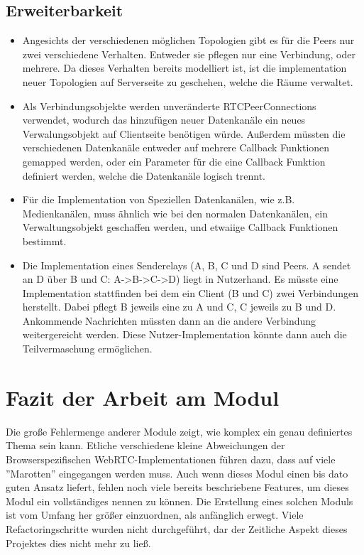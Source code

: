 \subsection{Erweiterbarkeit}
\begin{itemize}
\item
Angesichts der verschiedenen möglichen Topologien gibt es für die Peers nur zwei verschiedene Verhalten. 
Entweder sie pflegen nur eine Verbindung, oder mehrere.
Da dieses Verhalten bereits modelliert ist, ist die implementation neuer Topologien auf Serverseite zu geschehen, welche die Räume verwaltet.

\item
Als Verbindungsobjekte werden unveränderte RTCPeerConnections verwendet, wodurch das hinzufügen neuer Datenkanäle ein neues Verwalungsobjekt auf Clientseite benötigen würde.
Außerdem müssten die verschiedenen Datenkanäle entweder auf mehrere Callback Funktionen gemapped werden, oder ein Parameter für die eine Callback Funktion definiert werden, welche die Datenkanäle logisch trennt.

\item
Für die Implementation von Speziellen Datenkanälen, wie z.B. Medienkanälen, muss ähnlich wie bei den normalen Datenkanälen, ein Verwaltungsobjekt geschaffen werden, und etwaiige Callback Funktionen bestimmt.

\item
Die Implementation eines Senderelays (A, B, C und D sind Peers. A sendet an D über B und C: A->B->C->D) liegt in Nutzerhand. Es müsste eine Implementation stattfinden bei dem ein Client (B und C) zwei Verbindungen herstellt. 
Dabei pflegt B jeweils eine zu A und C, C jeweils zu B und D.
Ankommende Nachrichten müssten dann an die andere Verbindung weitergereicht werden.
Diese Nutzer-Implementation könnte dann auch die Teilvermaschung ermöglichen.
\end{itemize}



\section{Fazit der Arbeit am Modul}
Die große Fehlermenge anderer Module zeigt, wie komplex ein genau definiertes Thema sein kann.
Etliche verschiedene kleine Abweichungen der Browserspezifischen WebRTC-Implementationen führen dazu, dass auf viele ''Marotten'' eingegangen werden muss.
Auch wenn dieses Modul einen bis dato guten Ansatz liefert, fehlen noch viele bereits beschriebene Features, um dieses Modul ein vollständiges nennen zu können.
Die Erstellung eines solchen Moduls ist vom Umfang her größer einzuordnen, als anfänglich erwegt. 
Viele Refactoringschritte wurden nicht durchgeführt, dar der Zeitliche Aspekt dieses Projektes dies nicht mehr zu ließ.